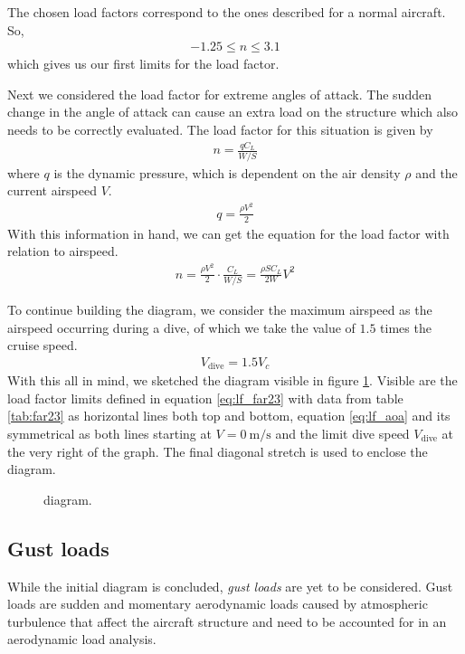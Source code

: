 \documentclass[english,fira]{ist-report}
\begin{document}
The chosen load factors correspond to the ones described for a normal aircraft. So,
\begin{gather}\label{eq:lf_far23}
    -1.25 \leq n \leq 3.1
\end{gather}
which gives us our first limits for the load factor.

Next we considered the load factor for extreme angles of attack. The sudden change in the angle of attack can cause an extra load on the structure which also needs to be correctly evaluated. The load factor for this situation is given by
\begin{gather}
    n = \frac{qC_L}{W/S}
\end{gather}
where $q$ is the dynamic pressure, which is dependent on the air density $\rho$ and the current airspeed $V$.
\begin{gather}
    q = \frac{\rho V^2}{2}
\end{gather}
With this information in hand, we can get the equation for the load factor with relation to airspeed.
\begin{align}\label{eq:lf_aoa}
    n = \frac{\rho V^2}{2}\cdot\frac{C_L}{W/S} = \frac{\rho SC_L}{2W}V^2
\end{align}

To continue building the \vnd{} diagram, we consider the maximum airspeed as the airspeed occurring during a dive, of which we take the value of $1.5$ times the cruise speed.
\begin{gather}
    V_{\text{dive}} = 1.5V_c
\end{gather}
With this all in mind, we sketched the diagram visible in figure \ref{fig:vn}. Visible are the load factor limits defined in equation \ref{eq:lf_far23} with data from table \ref{tab:far23} as horizontal lines both top and bottom, equation \ref{eq:lf_aoa} and its symmetrical as both lines starting at $V = \SI{0}{\meter\per\second}$ and the limit dive speed $V_{\text{dive}}$ at the very right of the graph. The final diagonal stretch is used to enclose the diagram.

\begin{figure}[ht]
    \centering
    
    \caption{\vnd{} diagram.}
    \label{fig:vn}
\end{figure}

\subsection{Gust loads}

While the initial \vnd{} diagram is concluded, \textit{gust loads} are yet to be considered. Gust loads are sudden and momentary aerodynamic loads caused by atmospheric turbulence that affect the aircraft structure and need to be accounted for in an aerodynamic load analysis.
\end{document}
